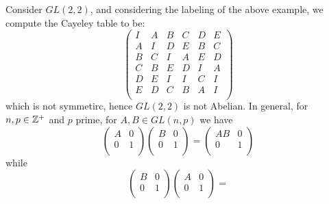 \begin{example}
    Consider $GL(2,2)$, and considering the labeling of the above example, we
    compute the Cayeley table to be:
    \begin{equation*}
        \begin{pmatrix}
            I   &   A   &   B   &   C   &   D   &   E   \\
            A   &   I   &   D   &   E   &   B   &   C   \\
            B   &   C   &   I   &   A   &   E   &   D   \\
            C   &   B   &   E   &   D   &   I   &   A   \\
            D   &   E   &   I   &   I   &   C   &   I   \\
            E   &   D   &   C   &   B   &   A   &   I   \\
        \end{pmatrix}
    \end{equation*}
    which is not symmetirc, hence $GL(2,2)$ is not Abelian. In general, for $n,
    p \in \mathbb{Z}^+$ and $p$ prime, for  $A,B \in GL(n,p)$ we have
    \begin{equation*}
        \begin{pmatrix}
            A   &   0   \\
            0   &   1   \\
        \end{pmatrix}
        \begin{pmatrix}
            B   &   0   \\
            0   &   1   \\
        \end{pmatrix}=
        \begin{pmatrix}
            AB  &   0   \\
            0   &   1   \\
        \end{pmatrix}
    \end{equation*}
    while
    \begin{equation*}
        \begin{pmatrix}
            B   &   0   \\
            0   &   1   \\
        \end{pmatrix}
        \begin{pmatrix}
            A   &   0   \\
            0   &   1   \\
        \end{pmatrix}=

\end{equation*}
\end{example}
